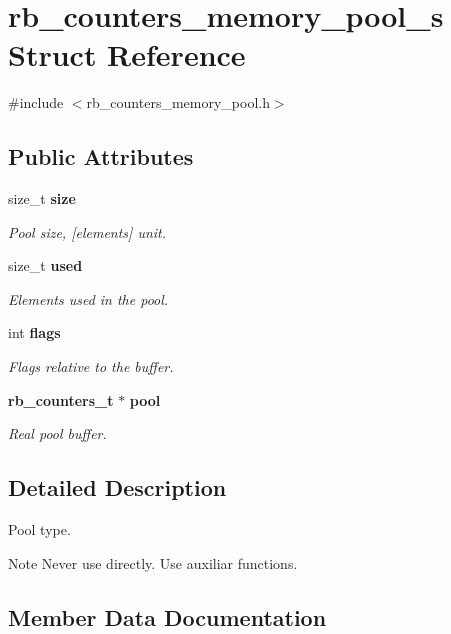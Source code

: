 \section{rb\+\_\+counters\+\_\+memory\+\_\+pool\+\_\+s Struct Reference}
\label{structrb__counters__memory__pool__s}


{\ttfamily \#include $<$rb\+\_\+counters\+\_\+memory\+\_\+pool.\+h$>$}

\subsection*{Public Attributes}
\begin{DoxyCompactItemize}
\item 
size\+\_\+t {\bf size}
\begin{DoxyCompactList}\small\item\em Pool size, [elements] unit. \end{DoxyCompactList}\item 
size\+\_\+t {\bf used}
\begin{DoxyCompactList}\small\item\em Elements used in the pool. \end{DoxyCompactList}\item 
int {\bf flags}
\begin{DoxyCompactList}\small\item\em Flags relative to the buffer. \end{DoxyCompactList}\item 
{\bf rb\+\_\+counters\+\_\+t} $\ast$ {\bf pool}
\begin{DoxyCompactList}\small\item\em Real pool buffer. \end{DoxyCompactList}\end{DoxyCompactItemize}


\subsection{Detailed Description}
Pool type. \begin{DoxyNote}{Note}
Never use directly. Use auxiliar functions. 
\end{DoxyNote}


\subsection{Member Data Documentation}
